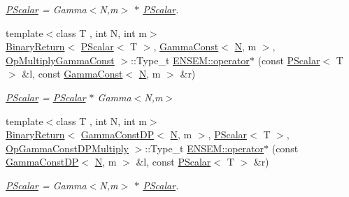 \begin{DoxyCompactItemize}
\begin{DoxyCompactList}\small\item\em \mbox{\hyperlink{classENSEM_1_1PScalar}{P\+Scalar}} = Gamma$<$\+N,m$>$ $\ast$ \mbox{\hyperlink{classENSEM_1_1PScalar}{P\+Scalar}}. \end{DoxyCompactList}\item 
{\footnotesize template$<$class T , int N, int m$>$ }\\\mbox{\hyperlink{structENSEM_1_1BinaryReturn}{Binary\+Return}}$<$ \mbox{\hyperlink{classENSEM_1_1PScalar}{P\+Scalar}}$<$ T $>$, \mbox{\hyperlink{classENSEM_1_1GammaConst}{Gamma\+Const}}$<$ \mbox{\hyperlink{operator__name__util_8cc_a7722c8ecbb62d99aee7ce68b1752f337}{N}}, m $>$, \mbox{\hyperlink{structENSEM_1_1OpMultiplyGammaConst}{Op\+Multiply\+Gamma\+Const}} $>$\+::Type\+\_\+t \mbox{\hyperlink{group__primscalar_ga1f975f2be8a25d77d5b101c1db566a23}{E\+N\+S\+E\+M\+::operator$\ast$}} (const \mbox{\hyperlink{classENSEM_1_1PScalar}{P\+Scalar}}$<$ T $>$ \&l, const \mbox{\hyperlink{classENSEM_1_1GammaConst}{Gamma\+Const}}$<$ \mbox{\hyperlink{operator__name__util_8cc_a7722c8ecbb62d99aee7ce68b1752f337}{N}}, m $>$ \&r)
\begin{DoxyCompactList}\small\item\em \mbox{\hyperlink{classENSEM_1_1PScalar}{P\+Scalar}} = \mbox{\hyperlink{classENSEM_1_1PScalar}{P\+Scalar}} $\ast$ Gamma$<$\+N,m$>$ \end{DoxyCompactList}\item 
{\footnotesize template$<$class T , int N, int m$>$ }\\\mbox{\hyperlink{structENSEM_1_1BinaryReturn}{Binary\+Return}}$<$ \mbox{\hyperlink{classENSEM_1_1GammaConstDP}{Gamma\+Const\+DP}}$<$ \mbox{\hyperlink{operator__name__util_8cc_a7722c8ecbb62d99aee7ce68b1752f337}{N}}, m $>$, \mbox{\hyperlink{classENSEM_1_1PScalar}{P\+Scalar}}$<$ T $>$, \mbox{\hyperlink{structENSEM_1_1OpGammaConstDPMultiply}{Op\+Gamma\+Const\+D\+P\+Multiply}} $>$\+::Type\+\_\+t \mbox{\hyperlink{group__primscalar_gab3054a5c0ba0653b3b4069e2449e20ab}{E\+N\+S\+E\+M\+::operator$\ast$}} (const \mbox{\hyperlink{classENSEM_1_1GammaConstDP}{Gamma\+Const\+DP}}$<$ \mbox{\hyperlink{operator__name__util_8cc_a7722c8ecbb62d99aee7ce68b1752f337}{N}}, m $>$ \&l, const \mbox{\hyperlink{classENSEM_1_1PScalar}{P\+Scalar}}$<$ T $>$ \&r)
\begin{DoxyCompactList}\small\item\em \mbox{\hyperlink{classENSEM_1_1PScalar}{P\+Scalar}} = Gamma$<$\+N,m$>$ $\ast$ \mbox{\hyperlink{classENSEM_1_1PScalar}{P\+Scalar}}. \end{DoxyCompactList}\item 

\end{DoxyCompactItemize}
